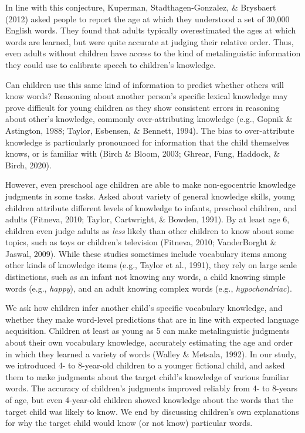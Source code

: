 \documentclass[10pt, letterpaper]{article}
\begin{document}
In line with this conjecture, Kuperman, Stadthagen-Gonzalez, \&
Brysbaert (2012) asked people to report the age at which they understood
a set of 30,000 English words. They found that adults typically
overestimated the ages at which words are learned, but were quite
accurate at judging their relative order. Thus, even adults without
children have access to the kind of metalinguistic information they
could use to calibrate speech to children's knowledge.

Can children use this same kind of information to predict whether others
will know words? Reasoning about another person's specific lexical
knowledge may prove difficult for young children as they show consistent
errors in reasoning about other's knowledge, commonly over-attributing
knowledge (e.g., Gopnik \& Astington, 1988; Taylor, Esbensen, \&
Bennett, 1994). The bias to over-attribute knowledge is particularly
pronounced for information that the child themselves knows, or is
familiar with (Birch \& Bloom, 2003; Ghrear, Fung, Haddock, \& Birch,
2020).

However, even preschool age children are able to make non-egocentric
knowledge judgments in some tasks. Asked about variety of general
knowledge skills, young children attribute different levels of knowledge
to infants, preschool children, and adults (Fitneva, 2010; Taylor,
Cartwright, \& Bowden, 1991). By at least age 6, children even judge
adults as \emph{less} likely than other children to know about some
topics, such as toys or children's television (Fitneva, 2010;
VanderBorght \& Jaswal, 2009). While these studies sometimes include
vocabulary items among other kinds of knowledge items (e.g., Taylor et
al., 1991), they rely on large scale distinctions, such as an infant not
knowing any words, a child knowing simple words (e.g., \emph{happy}),
and an adult knowing complex words (e.g., \emph{hypochondriac}).

We ask how children infer another child's specific vocabulary knowledge,
and whether they make word-level predictions that are in line with
expected language acquisition. Children at least as young as 5 can make
metalinguistic judgments about their own vocabulary knowledge,
accurately estimating the age and order in which they learned a variety
of words (Walley \& Metsala, 1992). In our study, we introduced 4- to
8-year-old children to a younger fictional child, and asked them to make
judgments about the target child's knowledge of various familiar words.
The accuracy of children's judgments improved reliably from 4- to
8-years of age, but even 4-year-old children showed knowledge about the
words that the target child was likely to know. We end by discussing
children's own explanations for why the target child would know (or not
know) particular words.
\end{document}
